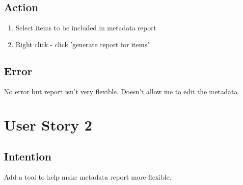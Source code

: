 \documentclass{article}
\begin{document}
\subsection{Action}
\begin{enumerate}
\item Select items to be included in metadata report
\item Right click - click 'generate report for items' 
\end{enumerate}
\subsection{Error}
No error but report isn't very flexible. Doesn't allow me to edit the metadata. 

\section{User Story 2}
\subsection{Intention}
Add a tool to help make metadata report more flexible. 
\end{document}
